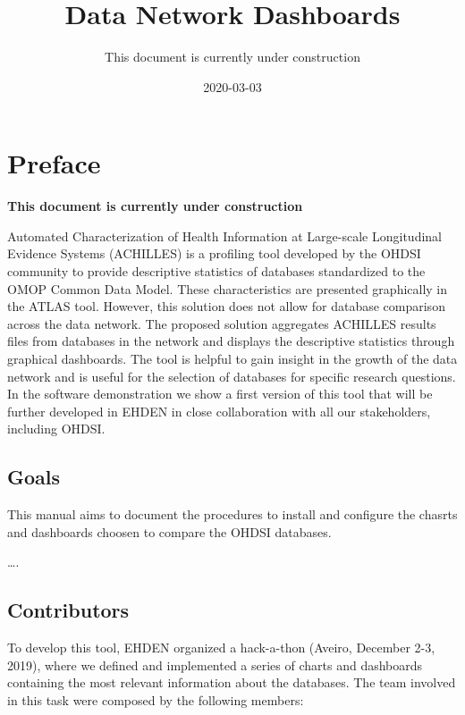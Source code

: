 \documentclass[]{book}
\title{Data Network Dashboards}
\author{This document is currently under construction}
\date{2020-03-03}
\begin{document}
\maketitle

{
\setcounter{tocdepth}{1}
\tableofcontents
}
\chapter*{Preface}\label{preface}

\textbf{This document is currently under construction}

Automated Characterization of Health Information at Large-scale
Longitudinal Evidence Systems (ACHILLES) is a profiling tool developed
by the OHDSI community to provide descriptive statistics of databases
standardized to the OMOP Common Data Model. These characteristics are
presented graphically in the ATLAS tool. However, this solution does not
allow for database comparison across the data network. The proposed
solution aggregates ACHILLES results files from databases in the network
and displays the descriptive statistics through graphical dashboards.
The tool is helpful to gain insight in the growth of the data network
and is useful for the selection of databases for specific research
questions. In the software demonstration we show a first version of this
tool that will be further developed in EHDEN in close collaboration with
all our stakeholders, including OHDSI.

\section*{Goals}\label{goals}

This manual aims to document the procedures to install and configure the
chasrts and dashboards choosen to compare the OHDSI databases.

\ldots{}.

\section*{Contributors}\label{contributors}

To develop this tool, EHDEN organized a hack-a-thon (Aveiro, December
2-3, 2019), where we defined and implemented a series of charts and
dashboards containing the most relevant information about the databases.
The team involved in this task were composed by the following members:
\end{document}
